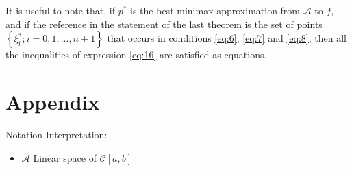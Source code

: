 \documentclass[11pt]{article}
\begin{document}
It is useful to note that, if $p^{*}$ is the best minimax approximation from $\mathscr{A}$ to $f$, and if the reference in the statement of the last theorem is the set of points $\left\{\xi_{i}^{*} ; i=0,1, \ldots, n+1\right\}$ that occurs in conditions \eqref{eq:6}, \eqref{eq:7} and \eqref{eq:8}, then all the inequalities of expression \eqref{eq:16} are satisfied as equations.

\section{Appendix}
Notation Interpretation:
\begin{itemize}
\item $\mathscr{A}$ Linear space of $\mathscr{C}[a,b]$
\end{itemize}
\end{document}
